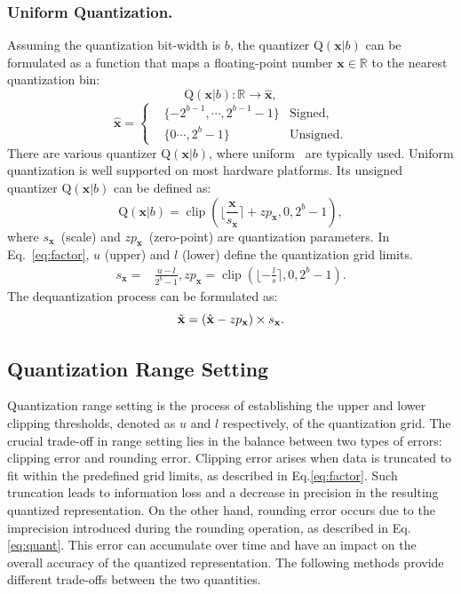 \documentclass[runningheads]{llncs}
\begin{document}
\subsubsection{Uniform Quantization.} Assuming the quantization bit-width is $b$, the quantizer $\textrm{Q}(\mathbf{x}|b)$ can be formulated as a function that maps a floating-point number $\mathbf{x}\in \mathbb{R}$ to the nearest quantization bin:
%
\begin{equation}
    \textrm{Q}(\mathbf{x}|b): \mathbb{R} \rightarrow \hat{\mathbf{x}},
\end{equation}
\begin{equation}
\hat{\mathbf{x}}=
\left\{\begin{aligned}
&\{-\textrm{2}^{b-1},\cdots ,\textrm{2}^{b-1}-\textrm{1}\} &\text{Signed},\\
&\{\textrm{0} \cdots ,\textrm{2}^{b}-\textrm{1}\}  &\text{Unsigned}.
\end{aligned}\right.
\label{eq:signed}
\end{equation}
%
There are various quantizer $\textrm{Q}(\mathbf{x}|b)$, where uniform~\cite{jacob2018quantization} are typically used. Uniform quantization is well supported on most hardware platforms. Its unsigned quantizer $\textrm{Q}(\mathbf{x}|b)$ can be defined as:
%
\begin{equation}
    \textrm{Q}(\mathbf{x}|b)=\operatorname{clip}(\lfloor\frac{\mathbf{x}}{s_\mathbf{x}}\rceil+zp_\mathbf{x}, \textrm{0}, \textrm{2}^{b}-\textrm{1}),
\label{eq:quant}
\end{equation}
where $s_\mathbf{x}$~(scale) and $zp_\mathbf{x}$~(zero-point) are quantization parameters. In Eq.~\ref{eq:factor}, $u$ (upper) and $l$ (lower) define the quantization grid limits. 
%
\begin{align}
    s_\mathbf{x}=&\frac{u-l}{\textrm{2}^b-\textrm{1}},zp_\mathbf{x}=\operatorname{clip}(\lfloor-\frac{l}{s}\rceil, \textrm{0}, \textrm{2}^{b}-\textrm{1}).
\label{eq:factor}
\end{align}
%
The dequantization process can be formulated as: 
\begin{equation}
    \Tilde{\mathbf{x}}=(\hat{\mathbf{x}}-zp_\mathbf{x}) \times s_\mathbf{x}.
\end{equation}
%
\subsection{Quantization Range Setting} 
\label{quantization_range_setting}
%
Quantization range setting is the process of establishing the upper and lower clipping thresholds, denoted as $u$ and $l$ respectively, of the quantization grid. The crucial trade-off in range setting lies in the balance between two types of errors: clipping error and rounding error. Clipping error arises when data is truncated to fit within the predefined grid limits, as described in Eq.\ref{eq:factor}. Such truncation leads to information loss and a decrease in precision in the resulting quantized representation. On the other hand, rounding error occurs due to the imprecision introduced during the rounding operation, as described in Eq.\ref{eq:quant}. This error can accumulate over time and have an impact on the overall accuracy of the quantized representation. The following methods provide different trade-offs between the two quantities.
%
\end{document}
